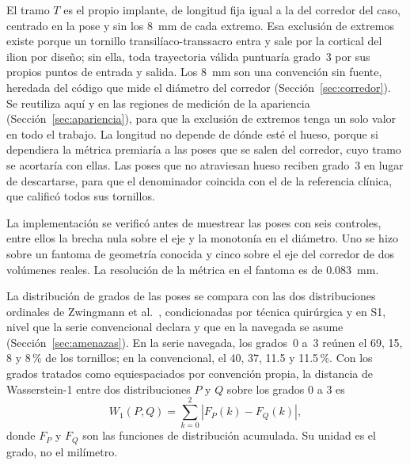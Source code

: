 El tramo $T$ es el propio implante, de longitud fija igual a la del corredor del caso, centrado en la pose y sin los 8~mm de cada extremo. Esa exclusión de extremos existe porque un tornillo transilíaco-transsacro entra y sale por la cortical del ilion por diseño; sin ella, toda trayectoria válida puntuaría grado~3 por sus propios puntos de entrada y salida. Los 8~mm son una convención sin fuente, heredada del código que mide el diámetro del corredor (Sección~\ref{sec:corredor}). Se reutiliza aquí y en las regiones de medición de la apariencia (Sección~\ref{sec:apariencia}), para que la exclusión de extremos tenga un solo valor en todo el trabajo. La longitud no depende de dónde esté el hueso, porque si dependiera la métrica premiaría a las poses que se salen del corredor, cuyo tramo se acortaría con ellas. Las poses que no atraviesan hueso reciben grado~3 en lugar de descartarse, para que el denominador coincida con el de la referencia clínica, que calificó todos sus tornillos.

La implementación se verificó antes de muestrear las poses con seis controles, entre ellos la brecha nula sobre el eje y la monotonía en el diámetro. Uno se hizo sobre un fantoma de geometría conocida y cinco sobre el eje del corredor de dos volúmenes reales. La resolución de la métrica en el fantoma es de 0.083~mm.

La distribución de grados de las poses se compara con las dos distribuciones ordinales de Zwingmann et al.~\cite{zwingmann2009navigated}, condicionadas por técnica quirúrgica y en S1, nivel que la serie convencional declara y que en la navegada se asume (Sección~\ref{sec:amenazas}). En la serie navegada, los grados~0 a~3 reúnen el 69, 15, 8 y 8\,\% de los tornillos; en la convencional, el 40, 37, 11.5 y 11.5\,\%. Con los grados tratados como equiespaciados por convención propia, la distancia de Wasserstein-1 entre dos distribuciones $P$ y $Q$ sobre los grados $0$ a $3$ es
\begin{equation}
W_1(P, Q) = \sum_{k=0}^{2} \left| F_P(k) - F_Q(k) \right|,
\label{eq:w1}
\end{equation}
donde $F_P$ y $F_Q$ son las funciones de distribución acumulada. Su unidad es el grado, no el milímetro.

